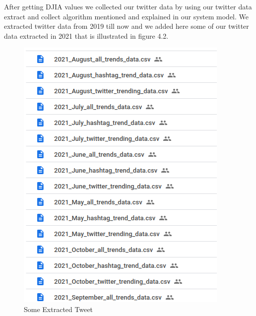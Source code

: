 After getting DJIA values we collected our twitter data by using our twitter data extract and collect algorithm mentioned and explained in our system model. We extracted twitter data from 2019 till now and we added here some of our twitter data extracted in 2021 that is illustrated in figure 4.2.\\
\begin{figure}[H]
    \centering
    \includegraphics[scale=.8]{img4/extracttweet.png}
    \caption{Some Extracted Tweet}
    \label{fig:extracttweet}
\end{figure}

